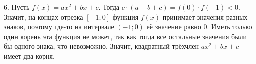 6. Пусть $f(x)=ax^2+bx+c.$ Тогда $c\cdot(a-b+c)=f(0)\cdot f(-1)<0.$ Значит, на концах отрезка $[-1;0]$ функция $f(x)$ принимает значения разных знаков, поэтому где-то на интервале $(-1;0)$ её значение равно 0. Иметь только один корень эта функция не может, так как тогда все остальные значения были бы одного знака, что невозможно. Значит, квадратный трёхчлен $ax^2+bx+c$ имеет два корня.\\
